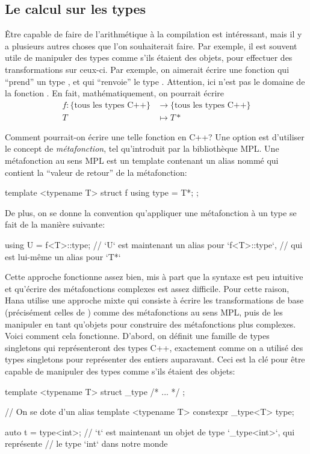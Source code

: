 \subsection{Le calcul sur les types}
Être capable de faire de l'arithmétique à la compilation est intéressant, mais
il y a plusieurs autres choses que l'on souhaiterait faire. Par exemple, il
est souvent utile de manipuler des types comme s'ils étaient des objets, pour
effectuer des transformations sur ceux-ci. Par exemple, on aimerait écrire
une fonction  qui ``prend'' un type , et qui ``renvoie'' le
type . Attention, ici  n'est pas le domaine de la fonction
. En fait, mathématiquement, on pourrait écrire
\begin{align*}
    f : \{\text{tous les types C++}\} &\to \{\text{tous les types C++}\}\\
                             T &\mapsto T*
\end{align*}

Comment pourrait-on écrire une telle fonction en C++? Une option est d'utiliser
le concept de \textit{métafonction}, tel qu'introduit par la bibliothèque MPL.
Une métafonction au sens MPL est un template contenant un alias nommé
 qui contient la ``valeur de retour'' de la métafonction:
\begin{cpp}
    template <typename T>
    struct f {
        using type = T*;
    };
\end{cpp}

De plus, on se donne la convention qu'appliquer une métafonction  à
un type  se fait de la manière suivante:
\begin{cpp}
    using U = f<T>::type;
    // `U` est maintenant un alias pour `f<T>::type`,
    // qui est lui-même un alias pour `T*`
\end{cpp}

Cette approche fonctionne assez bien, mis à part que la syntaxe est peu
intuitive et qu'écrire des métafonctions complexes est assez difficile.
Pour cette raison, Hana utilise une approche mixte qui consiste à écrire les
transformations de base (précisément celles de ) comme des
métafonctions au sens MPL, puis de les manipuler en tant qu'objets pour
construire des métafonctions plus complexes. Voici comment cela fonctionne.
D'abord, on définit une famille de types singletons qui représenteront des types
C++, exactement comme on a utilisé des types singletons pour représenter des
entiers auparavant. Ceci est la clé pour être capable de manipuler des types
comme s'ils étaient des objets:
\begin{cpp}
    template <typename T>
    struct _type { /* ... */ };

    // On se dote d'un alias
    template <typename T>
    constexpr _type<T> type{};

    auto t = type<int>;
    // `t` est maintenant un objet de type `_type<int>`, qui représente
    // le type `int` dans notre monde
\end{cpp}

